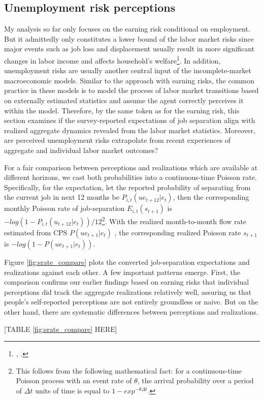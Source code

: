 \hypertarget{unemployment-risk-perceptions}{%
\subsection{Unemployment risk perceptions}\label{unemployment-risk-perceptions}}

My analysis so far only focuses on the earning risk conditional on employment. But it admittedly only constitutes a lower bound of the labor market risks since major events such as job loss and displacement usually result in more significant changes in labor income and affects household's welfare\footnote{\cite{low2010wage}, \cite{davis2011recessions}.}. In addition, unemployment risks are usually another central input of the incomplete-market macroeconomic models. Similar to the approach with earning risks, the common practice in these models is to model the process of labor market transitions based on externally estimated statistics and assume the agent correctly perceives it within the model. Therefore, by the same token as for the earning risk, this section examines if the survey-reported expectations of job separation align with realized aggregate dynamics revealed from the labor market statistics. Moreover, are perceived unemployment risks extrapolate from recent experiences of aggregate and individual labor market outcomes?


For a fair comparison between perceptions and realizations which are available at different horizons, we cast both probabilities into a continuous-time Poisson rate. Specifically, for the expectation, let the reported probability of separating from the current job in next 12 months be $P_{i,t}(ue_{t+12}|e_t)$, then the corresponding monthly Poisson rate of job-separation $E_{i,t}(s_{t+1})$ is $- log(1-P_{i,t}(u_{t+12}|e_t))/12$\footnote{This follows from the following mathematical fact: for a continuous-time Poisson process with an event rate of $\theta$, the arrival probability over a period of $\Delta t$ units of time is equal to $1-exp^{-\theta \Delta t}$.}. With the realized month-to-month flow rate estimated from CPS $P(ue_{t+1}|e_t)$ , the corresponding realized Poisson rate  $s_{t+1}$ is $-log(1-P(ue_{t+1}|e_t))$. 


Figure \ref{fig:srate_compare} plots the converted job-separation expectations and realizations against each other. A few important patterns emerge. First, the comparison confirms our earlier findings based on earning risks that individual perceptions did track the aggregate realizations relatively well, assuring us that people's self-reported perceptions are not entirely groundless or naive. But on the other hand, there are systematic differences between perceptions and realizations. 

\begin{center}
[TABLE \ref{fig:srate_compare} HERE]
\end{center}




